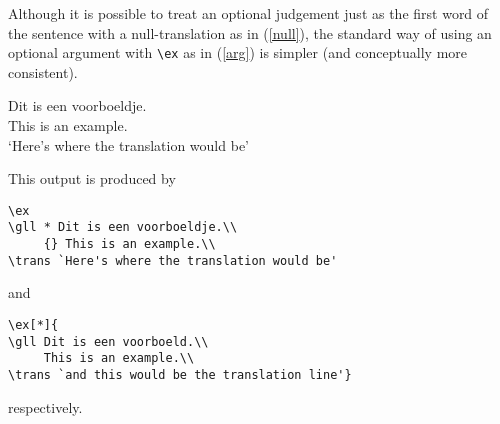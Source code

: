 \documentclass[11pt,a4paper]{article}
\begin{document}
Although it is possible to treat an optional judgement just as the
first word of the sentence with a null-translation as in (\ref{null}),
the standard way of using an optional argument with \verb'\ex' as in
(\ref{arg})  is simpler (and conceptually more consistent).
\begin{exe}
\ex\label{null}
\gll * Dit is een voorboeldje.\\
     {} This is an example.\\
\trans `Here's where the translation would be'

\end{exe}
\pagebreak[2]
This output is produced by
\begin{verbatim}
\ex
\gll * Dit is een voorboeldje.\\
     {} This is an example.\\
\trans `Here's where the translation would be'
\end{verbatim}
and
\begin{verbatim}
\ex[*]{
\gll Dit is een voorboeld.\\
     This is an example.\\
\trans `and this would be the translation line'}
\end{verbatim}
respectively.
\end{document}
